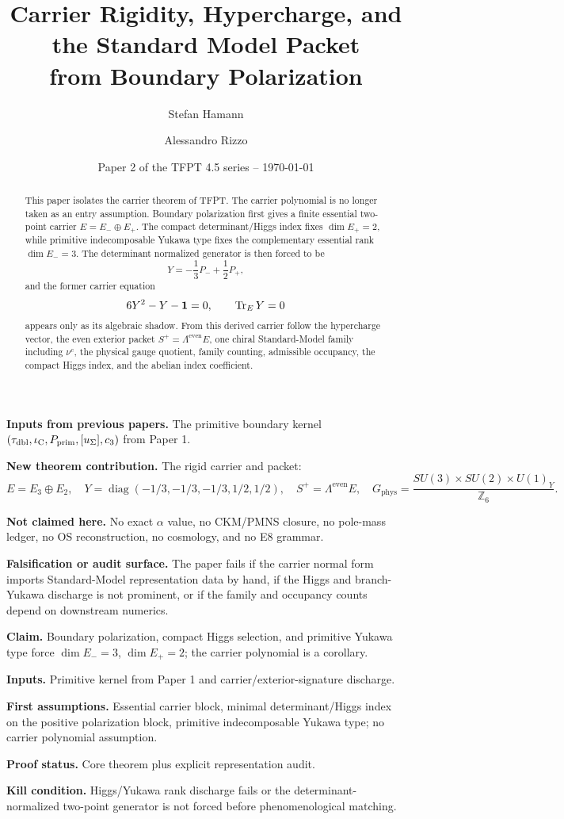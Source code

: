 \documentclass[11pt,a4paper]{article}
\title{\color{tfptblue}\textbf{Carrier Rigidity, Hypercharge, and the Standard Model Packet}\\[0.35em]
{\Large from Boundary Polarization}}
\author{Stefan Hamann \and Alessandro Rizzo}
\date{{\normalsize\color{tfptgray}\sffamily Paper 2 of the TFPT 4.5 series -- \today}}
\begin{document}
\maketitle

\begin{abstract}
This paper isolates the carrier theorem of TFPT. The carrier polynomial is no longer taken as an
entry assumption. Boundary polarization first gives a finite essential two-point carrier
$E=E_-\oplus E_+$. The compact determinant/Higgs index fixes $\dim E_+=2$, while primitive
indecomposable Yukawa type fixes the complementary essential rank $\dim E_-=3$. The determinant
normalized generator is then forced to be
\[
Y=-\frac13P_-+\frac12P_+,
\]
and the former carrier equation
\[
6Y^2-Y-\mathbf 1=0,\qquad \operatorname{Tr}_EY=0
\]
appears only as its algebraic shadow. From this derived carrier follow the hypercharge vector, the
even exterior packet $S^+=\Lambda^{\mathrm{even}}E$, one chiral Standard-Model family including
$\nu^c$, the physical gauge quotient, family counting, admissible occupancy, the compact Higgs
index, and the abelian index coefficient.
\end{abstract}

\begin{tfptfrontbox}
\textbf{Inputs from previous papers.} The primitive boundary kernel
$(\tau_{\mathrm{dbl}},\iota_{\mathrm C},P_{\mathrm{prim}},[u_\Sigma],c_3)$ from Paper 1.

\textbf{New theorem contribution.} The rigid carrier and packet:
\[
E=E_3\oplus E_2,\quad
Y=\operatorname{diag}(-1/3,-1/3,-1/3,1/2,1/2),\quad
S^+=\Lambda^{\mathrm{even}}E,\quad
G_{\mathrm{phys}}=\frac{SU(3)\times SU(2)\times U(1)_Y}{\mathbb Z_6}.
\]

\textbf{Not claimed here.} No exact $\alpha$ value, no CKM/PMNS closure, no pole-mass ledger, no OS
reconstruction, no cosmology, and no E8 grammar.

\textbf{Falsification or audit surface.} The paper fails if the carrier normal form imports
Standard-Model representation data by hand, if the Higgs and branch-Yukawa discharge is not
prominent, or if the family and occupancy counts depend on downstream numerics.
\end{tfptfrontbox}


\begin{tfptclaimcontract}
\textbf{Claim.} Boundary polarization, compact Higgs selection, and primitive Yukawa type force $\dim E_-=3$, $\dim E_+=2$; the carrier polynomial is a corollary.\par
\textbf{Inputs.} Primitive kernel from Paper 1 and carrier/exterior-signature discharge.\par
\textbf{First assumptions.} Essential carrier block, minimal determinant/Higgs index on the positive polarization block, primitive indecomposable Yukawa type; no carrier polynomial assumption.\par
\textbf{Proof status.} Core theorem plus explicit representation audit.\par
\textbf{Kill condition.} Higgs/Yukawa rank discharge fails or the determinant-normalized two-point generator is not forced before phenomenological matching.\par
\end{tfptclaimcontract}
\end{document}
